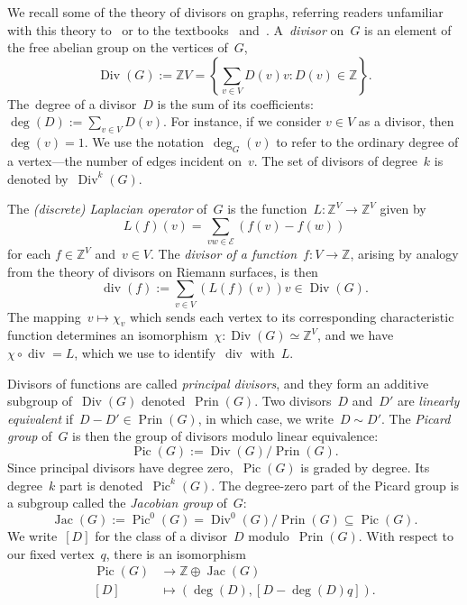 \documentclass{amsart}
\DeclareMathOperator{\Prin}{Prin}
\DeclareMathOperator{\Pic}{Pic}
\DeclareMathOperator{\Jac}{Jac}
\DeclareMathOperator{\Div}{Div}
\DeclareMathOperator{\smalldiv}{div}
\newcommand{\Z}{\mathbb{Z}}
\begin{document}
We recall some of the theory of divisors on graphs, referring readers unfamiliar
with this theory to~\cite{Baker} or to the textbooks~\cite{Corry}
and~\cite{Klivans}. 
A~{\em divisor} on~$G$ is an element of the free abelian group on the vertices
of~$G$,
\[
  \Div(G):=\Z V=\textstyle\left\{ \sum_{v\in V}D(v)v:D(v)\in\Z \right\}.
\]
The~{degree} of a divisor~$D$ is the sum of its
coefficients:~$\deg(D):=\sum_{v\in V}D(v)$.  For instance, if we consider $v\in
V$ as a divisor, then~$\deg(v)=1$.  We use the notation~$\deg_G(v)$ to refer to
the ordinary degree of a vertex---the number of edges incident on~$v$. The set
of divisors of degree~$k$ is denoted by~$\Div^k(G)$.  

The {\em (discrete) Laplacian operator} of~$G$ is the
function~$L\colon\Z^V\to\Z^V$ given by
\[
  L(f)(v)=\sum_{vw\in \mathcal{E}}\left( f(v)-f(w) \right)
\]
for each $f\in\Z^V$ and~$v\in V$.  The {\em divisor of a function}~$f\colon
V\to\Z$, arising by analogy from the theory of divisors on Riemann surfaces,
is then
\[
  \smalldiv(f):=\sum_{v\in V}\left( L(f)(v) \right)v\in\Div(G).
\]
The mapping~$v\mapsto\chi_v$ which sends each
vertex to its corresponding characteristic function determines an
isomorphism~$\chi\colon\Div(G)\simeq\Z^V$, and we have~$\chi\circ \smalldiv=L$,
which we use to identify~$\smalldiv$ with~$L$.

Divisors of functions are called {\em principal divisors}, and they form an
additive subgroup of~$\Div(G)$ denoted~$\Prin(G)$.  Two divisors~$D$ and~$D'$ are {\em linearly
equivalent} if~$D-D'\in\Prin(G)$, in which
case, we write~$D\sim D'$. The {\em
Picard group} of~$G$ is then the group of divisors modulo linear equivalence:
\[
  \Pic(G):=\Div(G)/\Prin(G).
\]
Since principal divisors have degree zero,~$\Pic(G)$ is graded by degree. Its
degree~$k$ part is denoted~$\Pic^k(G)$.  The degree-zero part of the Picard group
is a subgroup called the {\em Jacobian group} of~$G$:
\[
  \Jac(G):=\Pic^0(G)=\Div^0(G)/\Prin(G)\subseteq\Pic(G).
\]
We write~$[D]$ for the class of a divisor~$D$ modulo~$\Prin(G)$.  With respect
to our fixed vertex~$q$, there is an isomorphism
\begin{align}\label{eqn: Pic(G)}
  \Pic(G)&\to\Z\oplus\Jac(G)\\
  [D]&\mapsto\left(\deg(D), [D-\deg(D)q] \right).\nonumber
\end{align}
\end{document}
